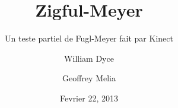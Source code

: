 \documentclass{beamer}
\title{Zigful-Meyer}
\subtitle{Un teste partiel de Fugl-Meyer fait par Kinect}
\author{William Dyce \and Geoffrey Melia}
\institute
{
  UM2
}
\date{Fevrier 22, 2013}
\begin{document}
\begin{frame}[plain]
  \titlepage
\end{frame}















\end{document}
